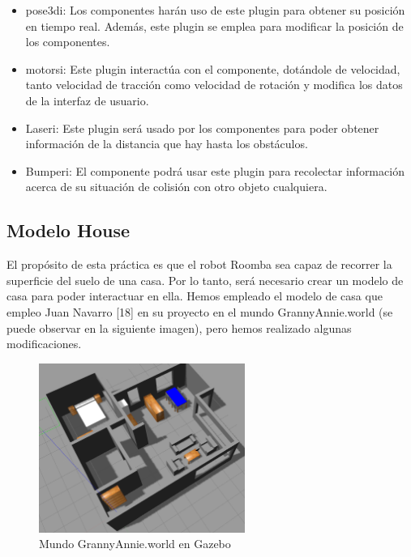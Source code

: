 \begin{itemize}
\item pose3di: Los componentes harán uso de este plugin para obtener su posición en tiempo real. Además, este plugin se emplea para modificar la posición de los componentes.
\item motorsi: Este plugin interactúa con el componente, dotándole de velocidad, tanto velocidad de tracción como velocidad de rotación y modifica los datos de la interfaz de usuario.
\item Laseri: Este plugin será usado por los componentes para poder obtener información de la distancia que hay hasta los obstáculos.
\item Bumperi: El componente podrá usar este plugin para recolectar información acerca de su situación de colisión con otro objeto cualquiera.
\end{itemize}

\subsection{Modelo House}
El propósito de esta práctica es que el robot Roomba sea capaz de recorrer la superficie del suelo de una casa. Por lo tanto, será necesario crear un modelo de casa para poder interactuar en ella. Hemos empleado el modelo de casa que empleo Juan Navarro [18] en su proyecto en el mundo GrannyAnnie.world (se puede observar en la siguiente imagen), pero hemos realizado algunas modificaciones. \\

\begin{figure}[H]
  \begin{center}
    \includegraphics[width=0.6\textwidth]{figures/Vacuum/ModeloCasa_antiguo.png}
		\caption{Mundo GrannyAnnie.world en Gazebo}
		\label{fig.modelocasa_antiguo}
		\end{center}
\end{figure}

